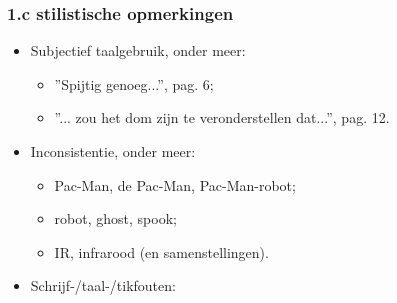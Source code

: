 \documentclass[12pt,a4paper]{report}
\begin{document}
   \subsubsection{1.c stilistische opmerkingen}

\begin{itemize}
	\item Subjectief taalgebruik, onder meer:
	\begin{itemize}
	\item ''Spijtig genoeg...'', pag. 6;
	\item ''... zou het dom zijn te veronderstellen dat...'', pag. 12.
	\end{itemize}
	\item Inconsistentie, onder meer:
\begin{itemize}
	\item Pac-Man, de Pac-Man, Pac-Man-robot;
	\item robot, ghost, spook;
	\item IR, infrarood (en samenstellingen).
\end{itemize}
	\item Schrijf-/taal-/tikfouten:
	

\end{itemize}
\end{document}

